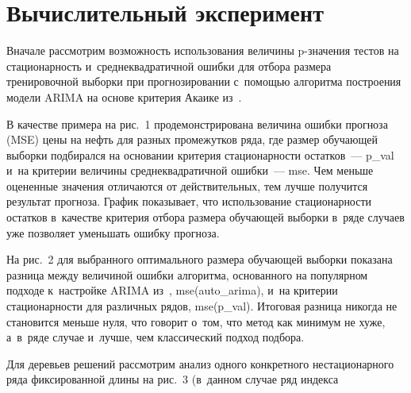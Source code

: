 \begin{multicols}{2}
\begin{enumerate}[1.]
        
        
    \end{enumerate}




\section{Вычислительный эксперимент}

 Вначале рассмотрим возможность использования величины p-зна\-че\-ния тес\-тов 
 на стационарность и~среднеквадратичной ошибки для отбора размера тренировочной 
 выборки при прогнозировании с~по\-мощью алгоритма построения модели ARIMA на основе 
 критерия Акаике из~\cite{17-kr}.

В качестве примера на рис.~1 продемонстрирована величина ошибки прогноза (MSE) 
 цены на нефть для разных промежутков ряда, где размер обуча\-ющей выборки подбирался 
 на основании критерия стационарности остатков~--- p\_val и~на критерии величины среднеквадратичной ошибки~--- 
 mse.  Чем меньше оцененные значения отличаются от действительных, 
 тем лучше получится результат прогноза. График показывает, что использование 
 стационарности остатков в~качестве критерия отбора размера обуча\-ющей выборки в~ряде случаев 
 уже позволяет уменьшать ошибку прогноза.
 


На рис.~2 для выбранного оптимального размера обучающей выборки показана 
разница между величиной ошибки алгоритма, основанного на популярном подходе к~настройке ARIMA из~\cite{17-kr}, 
mse(auto\_arima),  и~на критерии стационарности для различных рядов, mse(p\_val). 
Итоговая разница никогда не становится меньше нуля, что говорит о~том, что  метод 
как минимум не хуже, а~в~ряде случае и~лучше, чем классический подход подбора.



Для деревьев решений рассмотрим анализ одного конкретного нестационарного ряда фиксированной длины на рис.~3 
(в~данном случае ряд индекса\linebreak\vspace*{-12pt}

\pagebreak

\end{multicols}


\begin{figure*} %
\vspace*{1pt}
  \begin{center}  
    \mbox{%
\epsfxsize=99.747mm
}

\end{center}
\vspace*{-9pt}
    \label{pinki}
\end{figure*}

